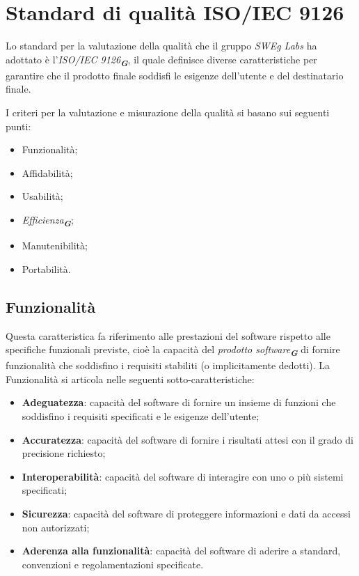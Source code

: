 


\section{Standard di qualità ISO/IEC 9126}

Lo standard per la valutazione della qualità che il gruppo \emph{SWEg Labs} ha adottato è l’\emph{ISO/IEC 9126}\textsubscript{\textit{\textbf{G}}}, 
il quale definisce diverse caratteristiche per garantire che il prodotto finale soddisfi
le esigenze dell’utente e del destinatario finale.

I criteri per la valutazione e misurazione della qualità si basano sui seguenti punti:
\begin{itemize}
    \item Funzionalità;
    \item Affidabilità;
    \item Usabilità;
    \item \emph{Efficienza}\textsubscript{\textit{\textbf{G}}};
    \item Manutenibilità;
    \item Portabilità.
\end{itemize}


\subsection{Funzionalità}

Questa caratteristica fa riferimento alle prestazioni del software rispetto alle specifiche funzionali 
previste, cioè la capacità del \emph{prodotto software}\textsubscript{\textit{\textbf{G}}} di fornire funzionalità che soddisfino
i requisiti stabiliti (o implicitamente dedotti). La Funzionalità si articola nelle seguenti
sotto-caratteristiche:
\begin{itemize}
    \item \textbf{Adeguatezza}: capacità del software di fornire un insieme di funzioni che soddisfino i requisiti specificati e le esigenze dell’utente;
    \item \textbf{Accuratezza}: capacità del software di fornire i risultati attesi con il grado di precisione richiesto;
    \item \textbf{Interoperabilità}: capacità del software di interagire con uno o più sistemi specificati;
    \item \textbf{Sicurezza}: capacità del software di proteggere informazioni e dati da accessi non autorizzati;
    \item \textbf{Aderenza alla funzionalità}: capacità del software di aderire a standard, convenzioni e regolamentazioni specificate.
\end{itemize}


